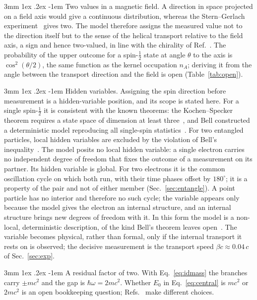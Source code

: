 \documentclass[%
 reprint, amsmath,amssymb, aps, prb, ]{revtex4-2}
\makeatletter
\numberwithin{equation}{section}
\renewcommand\paragraph{%
  \@startsection{paragraph}{4}{\z@}%
    {3mm \@plus 1ex \@minus .2ex}%
    {-1em}%
    {\normalfont\normalsize\itshape}}
\makeatother
\begin{document}
\paragraph{Two values in a magnetic field.} A direction in space projected on a field axis would give a continuous distribution, whereas the Stern--Gerlach experiment~\cite{ref:gerlach} gives two. The model therefore assigns the measured value not to the direction itself but to the sense of the helical transport relative to the field axis, a sign and hence two-valued, in line with the chirality of Ref.~\cite{ref:p50}. The probability of the upper outcome for a spin-$\tfrac12$ state at angle $\theta$ to the axis is $\cos^2(\theta/2)$, the same function as the kernel occupation $n_A$; deriving it from the angle between the transport direction and the field is open (Table~\ref{tab:open}).

\paragraph{Hidden variables.} Assigning the spin direction before measurement is a hidden-variable position, and its scope is stated here. For a single spin-$\tfrac12$ it is consistent with the known theorems: the Kochen--Specker theorem requires a state space of dimension at least three~\cite{ref:kochen67}, and Bell constructed a deterministic model reproducing all single-spin statistics~\cite{ref:bell66}. For two entangled particles, local hidden variables are excluded by the violation of Bell's inequality~\cite{ref:bell64,ref:chsh,ref:aspect82}. The model posits no local hidden variable: a single electron carries no independent degree of freedom that fixes the outcome of a measurement on its partner. Its hidden variable is global. For two electrons it is the common oscillation cycle on which both run, with their time phases offset by $180^\circ$; it is a property of the pair and not of either member (Sec.~\ref{sec:entangle}). A point particle has no interior and therefore no such cycle; the variable appears only because the model gives the electron an internal structure, and an internal structure brings new degrees of freedom with it. In this form the model is a non-local, deterministic description, of the kind Bell's theorem leaves open~\cite{ref:bohm52}. The variable becomes physical, rather than formal, only if the internal transport it rests on is observed; the decisive measurement is the transport speed $\beta c\approx0.04\,c$ of Sec.~\ref{sec:exp}.

\paragraph{A residual factor of two.} With Eq.~\eqref{eq:idmass} the branches carry $\pm mc^2$ and the gap is $\hbar\omega=2mc^2$. Whether $E_0$ in Eq.~\eqref{eq:central} is $mc^2$ or $2mc^2$ is an open bookkeeping question; Refs.~\cite{ref:p38,ref:p43,ref:p46} make different choices.
\end{document}
